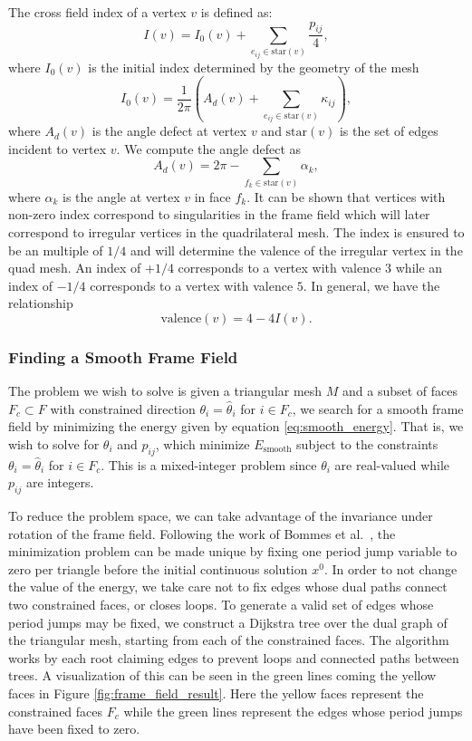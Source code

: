 \documentclass[12pt, letterpaper]{article}
\begin{document}
The cross field index of a vertex $v$ is defined as:
\begin{equation}
    I(v) = I_0(v) + \sum_{e_{ij} \in \text{star}(v)} \frac{p_{ij}}{4},
\end{equation}
where $I_0(v)$ is the initial index determined by the geometry of the mesh 
\begin{equation}
    I_0(v) =  \frac{1}{2\pi} \left( A_d(v) + \sum_{e_{ij} \in \text{star}(v)} \kappa_{ij} \right),
\end{equation}
where $A_d(v)$ is the angle defect at vertex $v$ and $\text{star}(v)$ is the set of edges incident to vertex $v$. We compute the angle defect as
\begin{equation}
    A_d(v) = 2\pi - \sum_{f_k \in \text{star}(v)} \alpha_k,
\end{equation}
where $\alpha_k$ is the angle at vertex $v$ in face $f_k$. It can be shown that vertices with non-zero index correspond to singularities in the frame field which will later correspond to irregular vertices in the quadrilateral mesh. The index is ensured to be an multiple of $1/4$ and will determine the valence of the irregular vertex in the quad mesh. An index of $+1/4$ corresponds to a vertex with valence $3$ while an index of $-1/4$ corresponds to a vertex with valence $5$. In general, we have the relationship
\begin{equation}
    \text{valence}(v) = 4 - 4 I(v).
\end{equation}

\subsubsection{Finding a Smooth Frame Field}
The problem we wish to solve is given a triangular mesh $M$ and a subset of faces $F_c \subset F$ with constrained direction $\theta_i = \hat{\theta}_i$ for $i \in F_c$, we search for a smooth frame field by minimizing the energy given by equation \ref{eq:smooth_energy}. That is, we wish to solve for $\theta_i$ and $p_{ij}$, which minimize $E_\text{smooth}$ subject to the constraints $\theta_i = \hat{\theta}_i$ for $i \in F_c$. This is a mixed-integer problem since $\theta_i$ are real-valued while $p_{ij}$ are integers.

To reduce the problem space, we can take advantage of the invariance under rotation of the frame field. Following the work of Bommes et al.~\cite{bommes2009mixed}, the minimization problem can be made unique by fixing one period jump variable to zero per triangle before the initial continuous solution $x^0$. In order to not change the value of the energy, we take care not to fix edges whose dual paths connect two constrained faces, or closes loops. To generate a valid set of edges whose period jumps may be fixed, we construct a Dijkstra tree over the dual graph of the triangular mesh, starting from each of the constrained faces. The algorithm works by each root claiming edges to prevent loops and connected paths between trees. A visualization of this can be seen in the green lines coming the yellow faces in Figure \ref{fig:frame_field_result}. Here the yellow faces represent the constrained faces $F_c$ while the green lines represent the edges whose period jumps have been fixed to zero.
\end{document}
